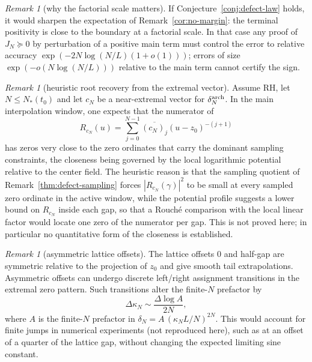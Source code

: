 \documentclass[11pt]{amsart}
\theoremstyle{definition}
\theoremstyle{remark}
\newtheorem{remark}[theorem]{Remark}
\theoremstyle{definition}
\begin{document}
\begin{remark}[why the factorial scale matters]\label{rmk:factorial-wall}
If Conjecture~\ref{conj:defect-law} holds, it would sharpen the expectation of
Remark~\ref{cor:no-margin}: the terminal positivity is close to the boundary at a factorial scale.  In
that case any proof of $J_N\succeq0$ by perturbation of a positive main term must control the error to
relative accuracy $\exp(-2N\log(N/L)(1+o(1)))$; errors of size $\exp(-o(N\log(N/L)))$ relative to the main
term cannot certify the sign.
\end{remark}

\begin{remark}[heuristic root recovery from the extremal vector]\label{prop:root-recovery}
Assume RH, let $N\le N_*(t_0)$ and let $c_N$ be a near-extremal vector for $\delta_N^{\rm arch}$.  In
the main interpolation window, one expects that
the numerator of
\[
   R_{c_N}(u)=\sum_{j=0}^{N-1}\overline{(c_N)_j}(u-z_0)^{-(j+1)}
\]
has zeros very close to the zero ordinates that carry the dominant sampling constraints, the
closeness being governed by the local logarithmic potential relative to the center field.  The
heuristic reason is that the sampling quotient of Remark~\ref{thm:defect-sampling} forces
$|R_{c_N}(\gamma)|^2$ to be small at every sampled zero ordinate in the active window, while the
potential profile suggests a lower bound on $R_{c_N}$ inside each gap, so that a Rouch\'e comparison
with the local linear factor would locate one zero of the numerator per gap.  This is not proved here;
in particular no quantitative form of the closeness is established.
\end{remark}

\begin{remark}[asymmetric lattice offsets]\label{rmk:asymmetric-offsets}
The lattice offsets $0$ and half-gap are symmetric relative to the projection of $z_0$ and give smooth
tail extrapolations.  Asymmetric offsets can undergo discrete left/right assignment transitions in the
extremal zero pattern.  Such transitions alter the finite-$N$ prefactor by
\[
   \Delta\kappa_N\sim \frac{\Delta\log A}{2N},
\]
where $A$ is the finite-$N$ prefactor in $\delta_N=A\,(\kappa_NL/N)^{2N}$.  This would account for
finite jumps in numerical experiments (not reproduced here), such as at an offset of a quarter of the lattice gap, without changing
the expected limiting sine constant.
\end{remark}
\end{document}
